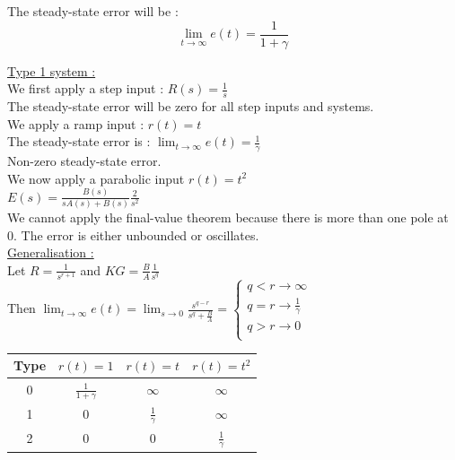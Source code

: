\documentclass[../main.tex]{subfiles}
\begin{document}
The steady-state error will be : \begin{equation}
    \lim_{t\rightarrow \infty} e(t) = \frac{1}{1+\gamma}
\end{equation}

\quad \underline{Type 1 system :}\\

We first apply a step input : $R(s) = \frac{1}{s}$\\
The steady-state error will be zero for all step inputs and systems.\\

We apply a ramp input : $r(t) = t$\\

The steady-state error is : $\lim_{t\rightarrow \infty} e(t) = \frac{1}{\gamma}$\\
Non-zero steady-state error.\\

We now apply a parabolic input $r(t) = t^2$\\
$E(s) = \frac{B(s)}{sA(s)+B(s)} \frac{2}{s^2}$\\
We cannot apply the final-value theorem because there is more than one pole at 0. The error is either unbounded or oscillates.\\

\quad \underline{Generalisation :}\\
Let $R = \frac{1}{s^{r+1}}$ and $KG = \frac{B}{A} \frac{1}{s^q}$\\
Then $\lim_{t\rightarrow \infty} e(t) = \lim_{s\rightarrow 0} \frac{s^{q-r}}{s^q+\frac{B}{A}} = \begin{cases}
    q<r \rightarrow \infty\\
    q=r \rightarrow \frac{1}{\gamma}\\
    q>r \rightarrow 0\\
\end{cases}$

\begin{table}[hbt!]
    \centering
    \begin{tabular}{c c c c}
        Type & $r(t) = 1$ & $r(t) = t$ & $r(t) = t^2$ \\ \hline
        0 & $\frac{1}{1+\gamma}$ & $\infty$ & $\infty$\\ \hline
        1 & 0 & $\frac{1}{\gamma}$ & $\infty$\\ \hline
        2 & 0 & 0 & $\frac{1}{\gamma}$\\
    \end{tabular}
\end{table}
\end{document}
